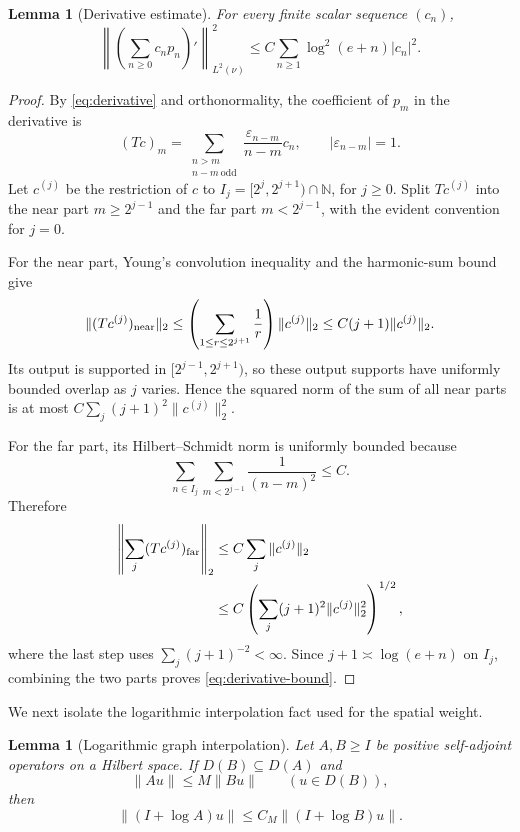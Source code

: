 \documentclass[11pt]{article}
\newtheorem{lemma}[theorem]{Lemma}
\newcommand{\N}{\mathbb N}
\begin{document}
\begin{lemma}[Derivative estimate]\label{lem:derivative}
For every finite scalar sequence $(c_n)$,
\begin{equation}\label{eq:derivative-bound}
 \left\|\left(\sum_{n\ge0}c_np_n\right)'\right\|_{L^2(\nu)}^2
 \le C\sum_{n\ge1}\log^2(e+n)|c_n|^2.
\end{equation}
\end{lemma}

\begin{proof}
By \eqref{eq:derivative} and orthonormality, the coefficient of $p_m$ in the
derivative is
\[
 (Tc)_m=\sum_{\substack{n>m\\n-m\ \mathrm{odd}}}
 \frac{\varepsilon_{n-m}}{n-m}c_n,
 \qquad |\varepsilon_{n-m}|=1.
\]
Let $c^{(j)}$ be the restriction of $c$ to
$I_j=[2^j,2^{j+1})\cap\N$, for $j\ge0$.  Split $Tc^{(j)}$ into the near
part $m\ge2^{j-1}$ and the far part $m<2^{j-1}$, with the evident convention
for $j=0$.

For the near part, Young's convolution inequality and the harmonic-sum bound
give
\[
 \|(Tc^{(j)})_{\rm near}\|_2
 \le \left(\sum_{1\le r\le2^{j+1}}\frac1r\right)\|c^{(j)}\|_2
 \le C(j+1)\|c^{(j)}\|_2.
\]
Its output is supported in $[2^{j-1},2^{j+1})$, so these output supports have
uniformly bounded overlap as $j$ varies.  Hence the squared norm of the sum
of all near parts is at most
$C\sum_j(j+1)^2\|c^{(j)}\|_2^2$.

For the far part, its Hilbert--Schmidt norm is uniformly bounded because
\[
 \sum_{n\in I_j}\sum_{m<2^{j-1}}\frac1{(n-m)^2}\le C.
\]
Therefore
\begin{align*}
 \left\|\sum_j(Tc^{(j)})_{\rm far}\right\|_2
 &\le C\sum_j\|c^{(j)}\|_2\\
 &\le C\left(\sum_j(j+1)^2\|c^{(j)}\|_2^2\right)^{1/2},
\end{align*}
where the last step uses $\sum_j(j+1)^{-2}<\infty$.  Since
$j+1\asymp\log(e+n)$ on $I_j$, combining the two parts proves
\eqref{eq:derivative-bound}.
\end{proof}

We next isolate the logarithmic interpolation fact used for the spatial
weight.

\begin{lemma}[Logarithmic graph interpolation]\label{lem:log-interpolation}
Let $A,B\ge I$ be positive self-adjoint operators on a Hilbert space.  If
$D(B)\subseteq D(A)$ and
\begin{equation}\label{eq:graph}
 \|Au\|\le M\|Bu\|\qquad(u\in D(B)),
\end{equation}
then
\begin{equation}\label{eq:log-graph}
 \|(I+\log A)u\|\le C_M\|(I+\log B)u\|.
\end{equation}
\end{lemma}
\end{document}
